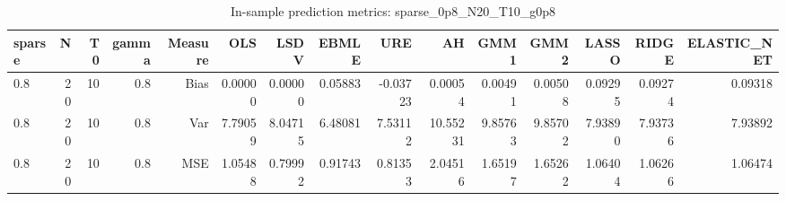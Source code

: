\begin{table}[!htbp]\centering
\caption{In-sample prediction metrics: sparse_0p8_N20_T10_g0p8}
\label{tab:table2_sparse_0p8_N20_T10_g0p8}
\begin{tabular}{lrrrrrrrrrrrrrr}
\hline
sparse & N & T0 & gamma & Measure & OLS & LSDV & EBMLE & URE & AH & GMM1 & GMM2 & LASSO & RIDGE & ELASTIC_NET \\
\hline
0.8 & 20 & 10 & 0.8 & Bias & 0.00000 & 0.00000 & 0.05883 & -0.03723 & 0.00054 & 0.00491 & 0.00508 & 0.09295 & 0.09274 & 0.09318 \\
0.8 & 20 & 10 & 0.8 & Var & 7.79059 & 8.04715 & 6.48081 & 7.53112 & 10.55231 & 9.85763 & 9.85702 & 7.93890 & 7.93736 & 7.93892 \\
0.8 & 20 & 10 & 0.8 & MSE & 1.05488 & 0.79992 & 0.91743 & 0.81353 & 2.04516 & 1.65197 & 1.65262 & 1.06404 & 1.06266 & 1.06474 \\
\hline
\end{tabular}
\end{table}

